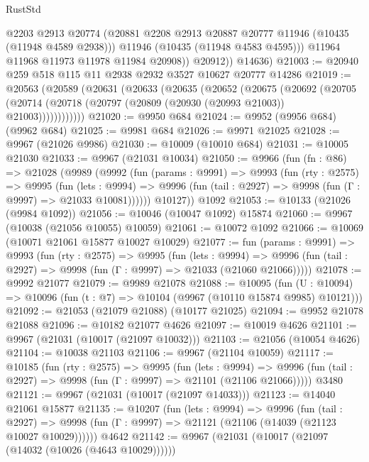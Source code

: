 \begin{lexlean}{RustStd}
\begin{coremodule}
{\begin{coremodule}
{{{{{{{{{{{{{{{{{{{{{{{{{{{{{{{{{{{{{{{{{{{{{{{{{{{{{{{{{{{{{{{{{{{{{{{{{{{{{{                @2203
                @2913
                @20774
                (@20881 @2208 @2913 @20887 @20777 @11946 (@10435 (@11948 @4589 @2938)))
                @11946
                (@10435 (@11948 @4583 @4595)))
              @11964
              @11968
              @11973
              @11978
              @11984
              @20908))
          @20912))
      @14636)
@21003 := @20940 @259 @518 @115 @11 @2938 @2932 @3527 @10627 @20777 @14286
@21019 := @20563
    (@20589
      (@20631
        (@20633
          (@20635
            (@20652
              (@20675
                (@20692
                  (@20705
                    (@20714 (@20718 (@20797 (@20809 (@20930 (@20993 @21003)) @21003))))))))))))
@21020 := @9950 @684
@21024 := @9952 (@9956 @684) (@9962 @684)
@21025 := @9981 @684
@21026 := @9971 @21025
@21028 := @9967 (@21026 @9986)
@21030 := @10009 (@10010 @684)
@21031 := @10005 @21030
@21033 := @9967 (@21031 @10034)
@21050 := @9966
    (fun (fn : @86) =>
    @21028
      (@9989
        (@9992
          (fun (params : @9991) =>
          @9993
            (fun (rty : @2575) =>
            @9995
              (fun (lets : @9994) =>
              @9996 (fun (tail : @2927) => @9998 (fun (Γ : @9997) => @21033 @10081))))))
        @10127))
    @1092
@21053 := @10133 (@21026 (@9984 @1092))
@21056 := @10046 (@10047 @1092) @15874
@21060 := @9967 (@10038 (@21056 @10055) @10059)
@21061 := @10072 @1092
@21066 := @10069 (@10071 @21061 @15877 @10027 @10029)
@21077 := fun (params : @9991) =>
  @9993
    (fun (rty : @2575) =>
    @9995
      (fun (lets : @9994) =>
      @9996 (fun (tail : @2927) => @9998 (fun (Γ : @9997) => @21033 (@21060 @21066)))))
@21078 := @9992 @21077
@21079 := @9989 @21078
@21088 := @10095
    (fun (U : @10094) => @10096 (fun (t : @7) => @10104 (@9967 (@10110 @15874 @9985) @10121)))
@21092 := @21053 (@21079 @21088) (@10177 @21025)
@21094 := @9952 @21078 @21088
@21096 := @10182 @21077 @4626
@21097 := @10019 @4626
@21101 := @9967 (@21031 (@10017 (@21097 @10032)))
@21103 := @21056 (@10054 @4626)
@21104 := @10038 @21103
@21106 := @9967 (@21104 @10059)
@21117 := @10185
    (fun (rty : @2575) =>
    @9995
      (fun (lets : @9994) =>
      @9996 (fun (tail : @2927) => @9998 (fun (Γ : @9997) => @21101 (@21106 @21066)))))
    @3480
@21121 := @9967 (@21031 (@10017 (@21097 @14033)))
@21123 := @14040 @21061 @15877
@21135 := @10207
    (fun (lets : @9994) =>
    @9996
      (fun (tail : @2927) =>
      @9998 (fun (Γ : @9997) => @21121 (@21106 (@14039 (@21123 @10027 @10029))))))
    @4642
@21142 := @9967 (@21031 (@10017 (@21097 (@14032 (@10026 (@4643 @10029))))))
}}}}}}}}}}}}}}}}}}}}}}}}}}}}}}}}}}}}}}}}}}}}}}}}}}}}}}}}}}}}}}}}}}}}}}}}}}}}}}
\end{coremodule}}
\end{coremodule}
\end{lexlean}
